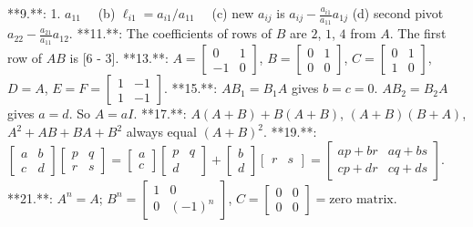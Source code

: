 

**9.**: 1. \(a_{11}\quad\) (b) \(\ell_{i1}=a_{i1}/a_{11}\quad\) (c) new \(a_{ij}\) is \(a_{ij}-\frac{a_{i1}}{a_{11}}a_{1j}\) (d) second pivot \(a_{22}-\frac{a_{21}}{a_{11}}a_{12}\).
**11.**: The coefficients of rows of \(B\) are \(2\), \(1\), \(4\) from \(A\). The first row of \(AB\) is [6 - 3].
**13.**: \(A=\begin{bmatrix}0&1\\ -1&0\end{bmatrix}\), \(B=\begin{bmatrix}0&1\\ 0&0\end{bmatrix}\), \(C=\begin{bmatrix}0&1\\ 1&0\end{bmatrix}\), \(D=A\), \(E=F=\begin{bmatrix}1&-1\\ 1&-1\end{bmatrix}\).
**15.**: \(AB_{1}=B_{1}A\) gives \(b=c=0\). \(AB_{2}=B_{2}A\) gives \(a=d\). So \(A=aI\).
**17.**: \(A(A+B)+B(A+B)\), \((A+B)(B+A)\), \(A^{2}+AB+BA+B^{2}\) always equal \((A+B)^{2}\).
**19.**: \(\begin{bmatrix}a&b\\ c&d\end{bmatrix}\begin{bmatrix}p&q\\ r&s\end{bmatrix}=\begin{bmatrix}a\\ c\end{bmatrix}\begin{bmatrix}p&q\\ d\end{bmatrix}+\begin{bmatrix}b\\ d\end{bmatrix}\begin{bmatrix}r&s\end{bmatrix}=\begin{bmatrix}ap+br&aq+bs\\ cp+dr&cq+ds\end{bmatrix}\).
**21.**: \(A^{n}=A\); \(B^{n}=\begin{bmatrix}1&0\\ 0&(-1)^{n}\end{bmatrix}\), \(C=\begin{bmatrix}0&0\\ 0&0\end{bmatrix}=\text{zero matrix}\).

